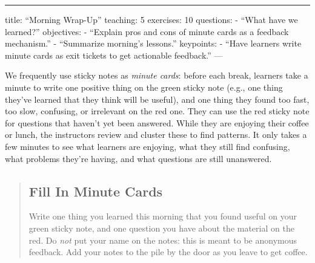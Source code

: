 \begin{center}
\rule{3in}{0.4pt}
\end{center}
title: ``Morning Wrap-Up''
teaching: 5
exercises: 10
questions:
- ``What have we learned?''
objectives:
- ``Explain pros and cons of minute cards as a feedback mechanism.''
- ``Summarize morning's lessons.''
keypoints:
- ``Have learners write minute cards as exit tickets to get actionable feedback.''
---

We frequently use sticky notes as \emph{minute cards}: before each break,
learners take a minute to write one positive thing on the green sticky
note (e.g., one thing they've learned that they think will be useful),
and one thing they found too fast, too slow, confusing, or irrelevant
on the red one.  They can use the red sticky note for questions that
haven't yet been answered.  While they are enjoying their coffee or
lunch, the instructors review and cluster these to find patterns.  It
only takes a few minutes to see what learners are enjoying, what they
still find confusing, what problems they're having, and what questions
are still unanswered.

\begin{quotation}   %
\subsection*{Fill In Minute Cards}

Write one thing you learned this morning that you found useful on
your green sticky note, and one question you have about the material
on the red.  Do \emph{not} put your name on the notes: this is meant to
be anonymous feedback.  Add your notes to the pile by the door as
you leave to get coffee.
\end{quotation}   %
